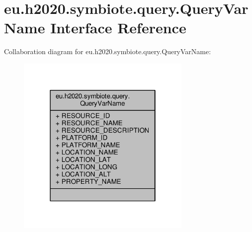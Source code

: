 \hypertarget{interfaceeu_1_1h2020_1_1symbiote_1_1query_1_1QueryVarName}{}\section{eu.\+h2020.\+symbiote.\+query.\+Query\+Var\+Name Interface Reference}
\label{interfaceeu_1_1h2020_1_1symbiote_1_1query_1_1QueryVarName}


Collaboration diagram for eu.\+h2020.\+symbiote.\+query.\+Query\+Var\+Name\+:
\nopagebreak
\begin{figure}[H]
\begin{center}
\leavevmode
\includegraphics[width=238pt]{interfaceeu_1_1h2020_1_1symbiote_1_1query_1_1QueryVarName__coll__graph}
\end{center}
\end{figure}
